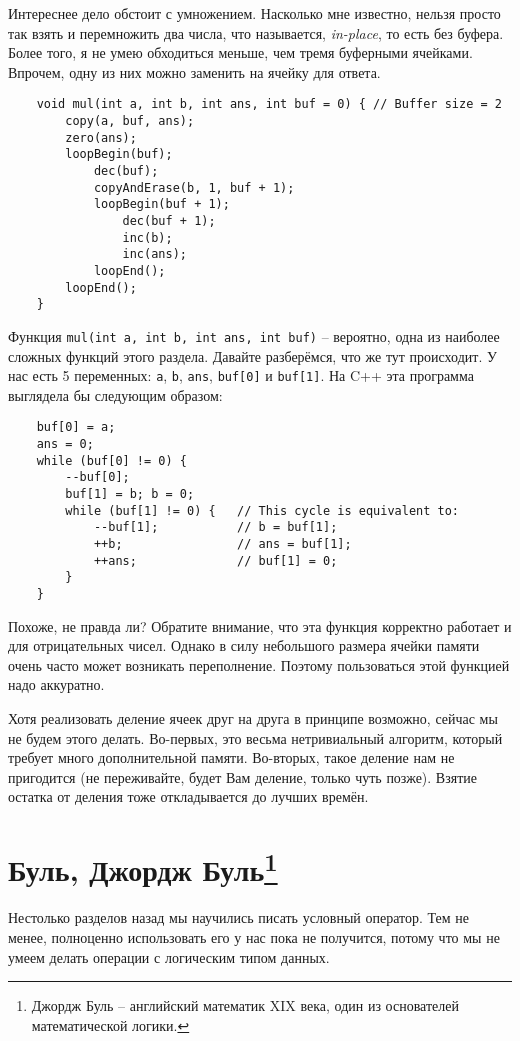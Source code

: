 \documentclass{book}
\begin{document}
Интереснее дело обстоит с умножением. Насколько мне известно, нельзя просто так взять и перемножить два числа, что называется,
{\it in-place}, то есть без буфера. Более того, я не умею обходиться меньше, чем тремя буферными ячейками. Впрочем, одну
из них можно заменить на ячейку для ответа.

\begin{verbatim}
    void mul(int a, int b, int ans, int buf = 0) { // Buffer size = 2
        copy(a, buf, ans);
        zero(ans);
        loopBegin(buf);
            dec(buf);
            copyAndErase(b, 1, buf + 1);
            loopBegin(buf + 1);
                dec(buf + 1);
                inc(b);
                inc(ans);
            loopEnd();
        loopEnd();
    }
\end{verbatim}

Функция \texttt{mul(int a, int b, int ans, int buf)} -- вероятно, одна из наиболее сложных функций этого раздела. Давайте
разберёмся, что же тут происходит. У нас есть 5 переменных: \texttt{a}, \texttt{b}, \texttt{ans}, \texttt{buf[0]} и \texttt{buf[1]}.
На C++ эта программа выглядела бы следующим образом:

\begin{verbatim}
    buf[0] = a;
    ans = 0;
    while (buf[0] != 0) {
        --buf[0];
        buf[1] = b; b = 0;
        while (buf[1] != 0) {   // This cycle is equivalent to:
            --buf[1];           // b = buf[1];
            ++b;                // ans = buf[1];
            ++ans;              // buf[1] = 0;
        }
    }
\end{verbatim}

Похоже, не правда ли? Обратите внимание, что эта функция корректно работает и для отрицательных чисел. Однако в силу
небольшого размера ячейки памяти очень часто может возникать переполнение. Поэтому пользоваться этой функцией надо аккуратно.

Хотя реализовать деление ячеек друг на друга в принципе возможно, сейчас мы не будем этого делать. Во-первых, это весьма нетривиальный
алгоритм, который требует много дополнительной памяти. Во-вторых, такое деление нам не пригодится (не переживайте, будет Вам
деление, только чуть позже). Взятие остатка от деления тоже откладывается до лучших времён.

\section[Буль, Джордж Буль]{Буль, Джордж Буль\protect\footnote{Джордж Буль -- английский математик XIX века, один из основателей
математической логики.}}
Нестолько разделов назад мы научились писать условный оператор. Тем не менее, полноценно использовать его у нас пока
не получится, потому что мы не умеем делать операции с логическим типом данных.
\end{document}
